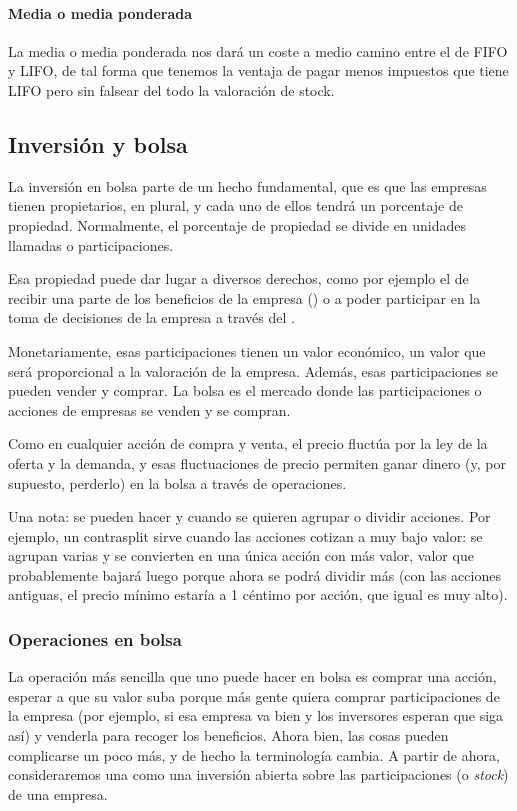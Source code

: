 \documentclass[nochap,palatino,shortheader]{apuntes}
\begin{document}
\paragraph{Media o media ponderada} La media o media ponderada nos dará un coste a medio camino entre el de FIFO y LIFO, de tal forma que tenemos la ventaja de pagar menos impuestos que tiene LIFO pero sin falsear del todo la valoración de stock.

\subsection{Inversión y bolsa}

La inversión en bolsa parte de un hecho fundamental, que es que las empresas tienen propietarios, en plural, y cada uno de ellos tendrá un porcentaje de propiedad. Normalmente, el porcentaje de propiedad se divide en unidades llamadas  o participaciones.

Esa propiedad puede dar lugar a diversos derechos, como por ejemplo el de recibir una parte de los beneficios de la empresa () o a poder participar en la toma de decisiones de la empresa a través del .

Monetariamente, esas participaciones tienen un valor económico, un valor que será proporcional a la valoración de la empresa. Además, esas participaciones se pueden vender y comprar. La bolsa es el mercado donde las participaciones o acciones de empresas se venden y se compran.

Como en cualquier acción de compra y venta, el precio fluctúa por la ley de la oferta y la demanda, y esas fluctuaciones de precio permiten ganar dinero (y, por supuesto, perderlo) en la bolsa a través de operaciones.

Una nota: se pueden hacer  y  cuando se quieren agrupar o dividir acciones. Por ejemplo, un contrasplit sirve cuando las acciones cotizan a muy bajo valor: se agrupan varias y se convierten en una única acción con más valor, valor que probablemente bajará luego porque ahora se podrá dividir más (con las acciones antiguas, el precio mínimo estaría a 1 céntimo por acción, que igual es muy alto).

\subsubsection{Operaciones en bolsa}

La operación más sencilla que uno puede hacer en bolsa es comprar una acción, esperar a que su valor suba porque más gente quiera comprar participaciones de la empresa (por ejemplo, si esa empresa va bien y los inversores esperan que siga así) y venderla para recoger los beneficios. Ahora bien, las cosas pueden complicarse un poco más, y de hecho la terminología cambia. A partir de ahora, consideraremos una  como una inversión abierta sobre las participaciones (o \textit{stock}) de una empresa.
\end{document}
